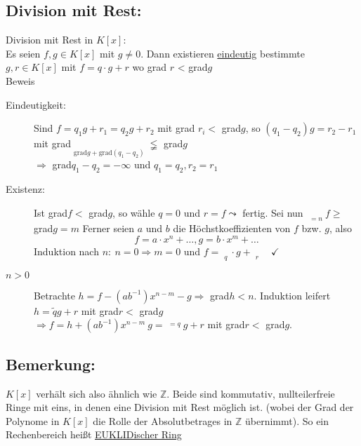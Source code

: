 \subsection{Division mit Rest:}
Division mit Rest in $K[x]$:\\
Es seien $f,g \in K[x]$ mit $g \neq 0$. Dann existieren \underline{eindeutig} bestimmte $g,r \in K[x]$ mit $f=q \cdot g + r$ wo grad $r$ < grad$g$\\
Beweis\\
\begin{description}
	\item[Eindeutigkeit:] Sind $ f=q_{1}g+r_{1} = q_{2}g+r_{2}$ mit grad $r_{i} <$ grad$g$, so $(q_{1}-q_{2})g=r_{2}-
				r_{1}$ mit grad$\mathop{\underbrace{r_{2}-r_{1}}}\limits_{\text{grad}g+\text{grad}(q_{1}-
				q_{2})} \lneqq $ grad$g$\\
				$\Rightarrow$ grad$q_{1}-q_{2} = -\infty$ und $q_{1} = q_{2}, r_{2}=r_{1}$
	\item[Existenz:] Ist grad$f <$ grad$g$, so wähle $q=0$ und $r = f \leadsto $ fertig. Sei nun 
				$\mathop{\underbrace{\text{grad}}}\limits_{=n}f \geq$ grad$g=m$ Ferner seien $a$ und $b$ die 
				Höchstkoeffizienten von $f$ bzw. $g$, also 
				\begin{equation*}
					f= a \cdot x^{n} + \dotsc, g= b \cdot x^{m} + \dotsc
				\end{equation*}
				Induktion nach $n: \ n=0 \Rightarrow m=0$ und $f = \mathop{\underbrace{(ab^{-1})}}\limits_{q} 
				\cdot g + \mathop{\underbrace{0}}\limits_{r} \quad \checkmark$
	\item[$n>0$] Betrachte $h=f-(ab^{-1})x^{n-m}-g\Rightarrow$ grad$h<n$. Induktion leifert $h = \tilde{q}g+r$ mit 
				grad$r <$ grad$g$\\
				$\Rightarrow f = h+(ab^{-1})x^{n-m} \ g=\mathop{\underbrace{((ab^{-1})x^{n-
				m}+\tilde{q})}}\limits^{=q}g+r$ mit grad$r <$ grad$g$.
\end{description}
%
%
%
\subsection{Bemerkung:}
$K[x]$ verhält sich also ähnlich wie $\mathbb{Z}$. Beide sind kommutativ, nullteilerfreie Ringe mit eins, in denen eine Division mit Rest möglich ist. (wobei der Grad der Polynome in $K[x]$ die Rolle der Absolutbetrages in $\mathbb{Z}$ übernimmt). So ein Rechenbereich heißt \underline{EUKLIDischer Ring}
%
%
%
